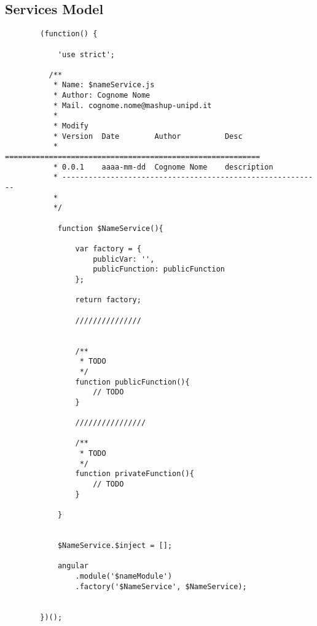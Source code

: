 	\subsection{Services Model} %
	\label{sub:services_model}
	\begin{verbatim}
		(function() {

			'use strict';

		  /**
		   * Name: $nameService.js
		   * Author: Cognome Nome
		   * Mail. cognome.nome@mashup-unipd.it
		   *
		   * Modify
		   * Version  Date        Author          Desc
		   * ==========================================================
		   * 0.0.1    aaaa-mm-dd  Cognome Nome    description
		   * -----------------------------------------------------------
		   *
		   */

			function $NameService(){

				var factory = {
					publicVar: '',
					publicFunction: publicFunction
				};

				return factory;

				///////////////


				/**
				 * TODO
				 */
				function publicFunction(){
					// TODO
				}

				////////////////
				
				/**
				 * TODO
				 */
				function privateFunction(){
					// TODO
				}

			}


			$NameService.$inject = [];

			angular
				.module('$nameModule')
				.factory('$NameService', $NameService);


		})();
	\end{verbatim}

